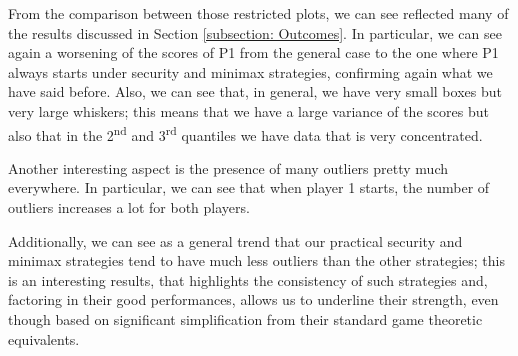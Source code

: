 From the comparison between those restricted plots, we can see reflected many of the results discussed in Section \ref{subsection: Outcomes}.
In particular, we can see again a worsening of the scores of P1 from the general case to the one where P1 always starts under security and minimax strategies, confirming again what we have said before.
Also, we can see that, in general, we have very small boxes but very large whiskers; this means that we have a large variance of the scores but also that in the 2\textsuperscript{nd} and 3\textsuperscript{rd} quantiles we have data that is very concentrated.

Another interesting aspect is the presence of many outliers pretty much everywhere. In particular, we can see that when player 1 starts, the number of outliers increases a lot for both players.

Additionally, we can see as a general trend that our practical security and minimax strategies tend to have much less outliers than the other strategies; this is an interesting results, that highlights the consistency of such strategies and, factoring in their good performances, allows us to underline their strength, even though based on significant simplification from their standard game theoretic equivalents.